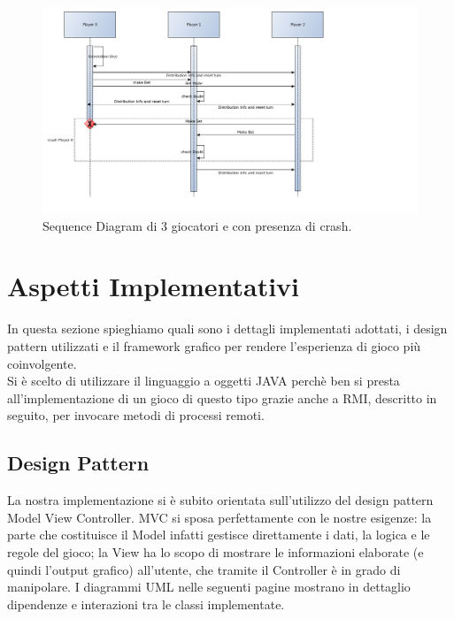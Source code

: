 \documentclass{llncs}
\begin{document}
		\begin{figure}[H]
			\includegraphics[scale=0.34]{img/Activity.png}
			\caption{\small{Sequence Diagram di 3 giocatori e con presenza di crash.}}
			\label{activity}
		\end{figure}
	\newpage
	\section{Aspetti Implementativi}%
	In questa sezione spieghiamo quali sono i dettagli implementati adottati, i design pattern utilizzati e il framework grafico per rendere l'esperienza di gioco più coinvolgente.\\
	Si è scelto di utilizzare il linguaggio a oggetti JAVA perchè ben si presta all'implementazione di un gioco di questo tipo grazie anche a RMI, descritto in seguito, per invocare metodi di processi remoti.
		\subsection{Design Pattern}
			La nostra implementazione si è subito orientata sull'utilizzo del design pattern Model View Controller\cite{MVC}. MVC si sposa perfettamente con le nostre esigenze: la parte che costituisce il Model infatti gestisce direttamente i dati, la logica e le regole del gioco; la View ha lo scopo di mostrare le informazioni elaborate (e quindi l'output grafico) all'utente, che tramite il Controller è in grado di manipolare. I diagrammi UML nelle seguenti pagine mostrano in dettaglio dipendenze e interazioni tra le classi implementate.
			
\end{document}
